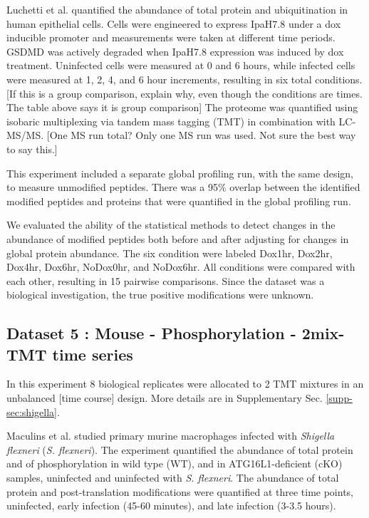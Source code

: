\documentclass[mcp]{article}
\numberwithin{table}{section}
\def\todo#1{{\color{red}[#1]}}
\begin{document}
\medskip {} Luchetti et al. \cite{LUCHETTI2021} quantified the abundance of total protein and ubiquitination in human epithelial cells. Cells were engineered to express IpaH7.8 under a dox inducible promoter and measurements were taken at different time periods. GSDMD was actively degraded when IpaH7.8 expression was induced by dox treatment. Uninfected cells were measured at 0 and 6 hours, while infected cells were measured at 1, 2, 4, and 6 hour increments, resulting in six total conditions. \todo{If this is a group comparison, explain why, even though the conditions are times. The table above says it is group comparison} The proteome was quantified using isobaric multiplexing via tandem mass tagging (TMT) in combination with LC-MS/MS. \todo{One MS run total? Only one MS run was used. Not sure the best way to say this.}

\medskip {} This experiment included a separate global profiling run, with the same design, to measure unmodified peptides. There was a 95\% overlap between the identified modified peptides and proteins that were quantified in the global profiling run.

\medskip {} We evaluated the ability of the statistical methods to detect changes in the abundance of modified peptides both before and after adjusting for changes in global protein abundance. The six condition were labeled Dox1hr, Dox2hr, Dox4hr, Dox6hr, NoDox0hr, and NoDox6hr. All conditions were compared with each other, resulting in 15 pairwise comparisons. Since the dataset was a biological investigation, the true positive modifications were unknown.


\subsection*{Dataset 5 : Mouse - Phosphorylation - 2mix-TMT time series}
\label{sec:exp_proc_dataset5}
In this experiment 8 biological replicates were allocated to 2 TMT mixtures in an unbalanced \todo{time course} design. More details are in Supplementary Sec. \ref{supp-sec:shigella}.


\medskip {} Maculins et al. \cite{Maculins} studied primary murine macrophages infected with {\it Shigella flexneri} ({\it S. flexneri}). The experiment quantified the abundance of total protein and of phosphorylation in wild type (WT), and in ATG16L1-deficient (cKO) samples, uninfected and uninfected with {\it S. flexneri}. The abundance of total protein and post-translation modifications were quantified at three time points, uninfected, early infection (45-60 minutes), and late infection (3-3.5 hours). 
\end{document}
